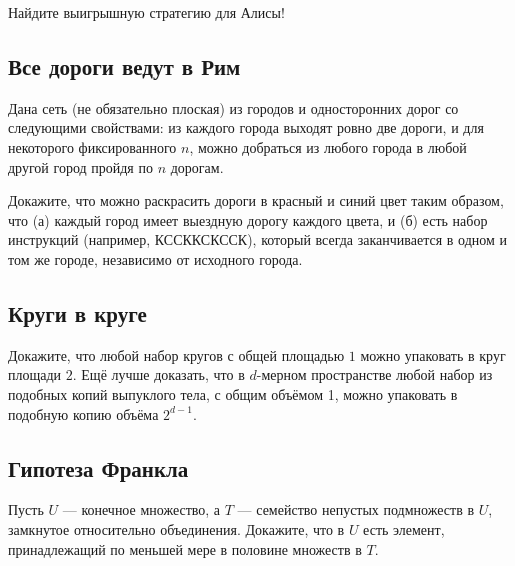 Найдите выигрышную стратегию для Алисы!

\subsection*{Все дороги ведут в Рим}

Дана сеть (не обязательно плоская) из городов и односторонних дорог со следующими свойствами:
из каждого города выходят ровно две дороги, и для некоторого фиксированного $n$, можно добраться из любого города в любой другой город пройдя по $n$ дорогам.

Докажите, что можно раскрасить дороги в красный и синий цвет таким образом, что (а) каждый город имеет выездную дорогу каждого цвета, и (б) есть набор инструкций (например, КССККСКССК), который всегда заканчивается в одном и том же городе, независимо от исходного города.

\subsection*{Круги в круге}

Докажите, что любой набор кругов с общей площадью $1$ можно упаковать в круг площади $2$.
Ещё лучше доказать, что в $d$-мерном пространстве любой набор из подобных копий выпуклого тела, с общим объёмом 1, можно упаковать в подобную копию объёма $2^{d-1}$.

\subsection*{Гипотеза Франкла}

Пусть $U$ --- конечное множество, а $T$ --- семейство непустых подмножеств в $U$, замкнутое относительно объединения.
Докажите, что в $U$ есть элемент, принадлежащий по меньшей мере в половине множеств в $T$.
